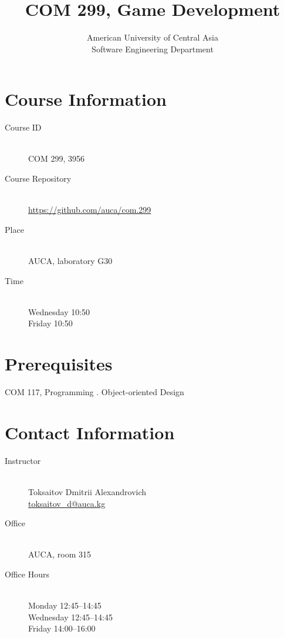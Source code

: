 \documentclass[12pt,a4paper,oneside]{article}
\newcommand{\R}[1]{\uppercase\expandafter{\romannumeral #1\relax}}
\begin{document}
    \title{COM 299, Game Development}
    \author{
        American University of Central Asia\\
        Software Engineering Department
    }
    \date{}
    \maketitle

    \section{Course Information}

        \begin{description}
            \item[Course ID]\hfill\\
                COM 299, 3956
            \item[Course Repository]\hfill\\
                \url{https://github.com/auca/com.299}
            \item[Place]\hfill\\
                AUCA, laboratory G30
            \item[Time]\hfill\\
                Wednesday 10:50\\
                Friday 10:50
        \end{description}

    \section{Prerequisites}

        COM 117, Programming \R{2}. Object-oriented Design

        \section{Contact Information}

            \begin{description}
                \item[Instructor]\hfill\\
                    Toksaitov Dmitrii Alexandrovich\\
                    \href{mailto:toksaitov_d@auca.kg}{toksaitov\_d@auca.kg}
                \item[Office]\hfill\\
                    AUCA, room 315
                \item[Office Hours]\hfill\\
                    Monday 12:45--14:45\\
                    Wednesday 12:45--14:45\\
                    Friday 14:00--16:00
            \end{description}
\end{document}
